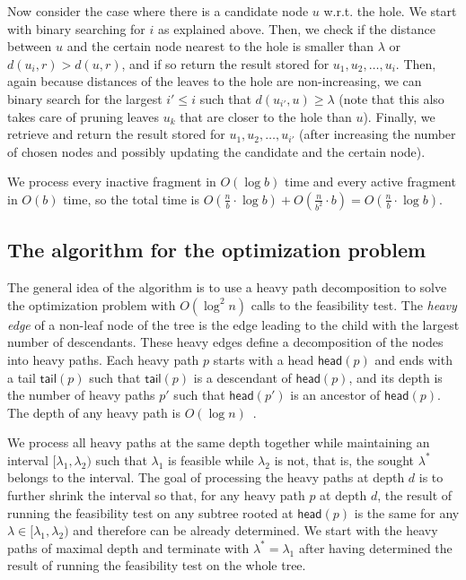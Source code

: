 \documentclass[a4paper,UKenglish]{lipics-v2016}
\theoremstyle{plain}
\newcommand{\head}{\textsf{head}}
\newcommand{\tail}{\textsf{tail}}
\begin{document}
Now consider the case where there is a candidate node $u$ w.r.t. the hole. We start with binary searching for $i$ as explained above. Then,
we check if the distance between $u$ and the certain node nearest to the hole is smaller than $\lambda$ or
$d(u_{i},r)>d(u,r)$, and if so return the result stored for $u_{1},u_{2},\ldots,u_{i}$. Then, again because distances of the leaves
to the hole are non-increasing, we can binary search for the largest $i'\leq i$ such that $d(u_{i'},u)\geq \lambda$
(note that this also takes care of pruning leaves $u_{k}$ that are closer to the hole than $u$).
Finally, we retrieve and return the result stored for $u_{1},u_{2},\ldots,u_{i'}$ (after increasing the number of chosen nodes
and possibly updating the candidate and the certain node).

We process every inactive fragment in $O(\log b)$ time and every active fragment in $O(b)$ time, so the total time is
$O(\frac{n}{b} \cdot \log b) + O(\frac{n}{b^2} \cdot b) = O(\frac{n}{b}\cdot \log b)$.

\subsection{The algorithm for the optimization problem} \label{sec:nloglogn}

The general idea of the algorithm is to use a heavy path decomposition to solve the optimization  problem
with $O(\log^{2}n)$ calls to the feasibility test. The {\em heavy edge} of a non-leaf node of the tree is the edge leading to the child
with the largest number of descendants. These heavy edges define a decomposition of the nodes into heavy paths. Each heavy
path $p$ starts with a head $\head(p)$ and ends with a tail $\tail(p)$ such that $\tail(p)$ is a descendant of $\head(p)$,
and its depth is the number of heavy paths $p'$ such that $\head(p')$ is an ancestor of $\head(p)$. The depth of any heavy path is 
$O(\log n)$~\cite{Sleator1983}.

We process all heavy paths at the same depth together while maintaining an interval $[\lambda_{1},\lambda_{2})$ such that
$\lambda_{1}$ is feasible while $\lambda_{2}$ is not, that is, the sought $\lambda^{*}$ belongs to the interval.
The goal of processing the heavy paths at depth $d$ is to further shrink the interval so that, for any heavy path $p$ at depth $d$,
the result of running the feasibility
test on any subtree rooted at $\head(p)$ is the same for any $\lambda\in[\lambda_{1},\lambda_{2})$ and therefore can
be already determined. We start with the heavy paths of maximal depth and terminate
with $\lambda^{*}=\lambda_{1}$ after having determined the result of running the feasibility test on the whole tree.
\end{document}
